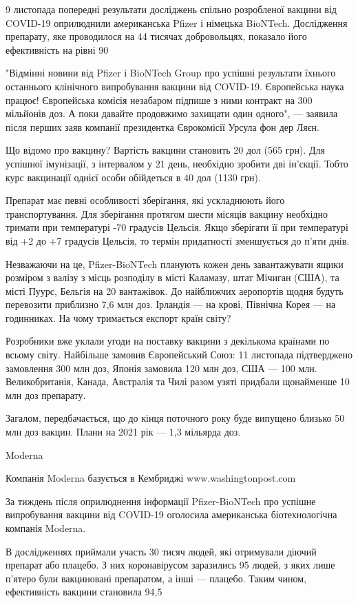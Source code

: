 9 листопада попередні результати досліджень спільно розробленої вакцини від COVID-19 оприлюднили американська Pfizer і німецька BioNTech. Дослідження препарату, яке проводилося на 44 тисячах добровольцях, показало його ефективність на рівні 90%

"Відмінні новини від Pfizer і BioNTech Group про успішні результати їхнього останнього клінічного випробування вакцини від COVID-19. Європейська наука працює! Європейська комісія незабаром підпише з ними контракт на 300 мільйонів доз. А поки давайте продовжимо захищати один одного", --- заявила після перших заяв компанії президентка Єврокомісії Урсула фон дер Ляєн.

    Що відомо про вакцину? Вартість вакцини становить 20 дол (565 грн). Для успішної імунізації, з інтервалом у 21 день, необхідно зробити дві ін’єкції. Тобто курс вакцинації однієї особи обійдеться в 40 дол (1130 грн).

    Препарат має певні особливості зберігання, які ускладнюють його транспортування. Для зберігання протягом шести місяців вакцину необхідно тримати при температурі -70 градусів Цельсія. Якщо зберігати її при температурі від +2 до +7 градусів Цельсія, то термін придатності зменшується до п'яти днів.

Незважаючи на це, Pfizer-BioNTech планують кожен день завантажувати ящики розміром з валізу з місць розподілу в місті Каламазу, штат Мічиган (США), та місті Пуурс, Бельгія на 20 вантажівок. До найближчих аеропортів щодня будуть перевозити приблизно 7,6 млн доз.
Ірландія --- на крові, Північна Корея --- на годинниках. На чому тримається експорт країн світу?

Розробники вже уклали угоди на поставку вакцини з декількома країнами по всьому світу. Найбільше замовив Європейський Союз: 11 листопада підтверджено замовлення 300 млн доз, Японія замовила 120 млн доз, США --- 100 млн. Великобританія, Канада, Австралія та Чилі разом узяті придбали щонайменше 10 млн доз препарату.

    Загалом, передбачається, що до кінця поточного року буде випущено близько 50 млн доз вакцин. Плани на 2021 рік --- 1,3 мільярда доз.

Moderna
 
Компанія Moderna базується в Кембриджі
www.washingtonpost.com

За тиждень після оприлюднення інформації Pfizer-BioNTech про успішне випробування вакцини від COVID-19 оголосила американська біотехнологічна компанія Moderna.

В дослідженнях приймали участь 30 тисяч людей, які отримували діючий препарат або плацебо. З них коронавірусом заразились 95 людей, з яких лише п'ятеро були вакциновані препаратом, а інші --- плацебо. Таким чином, ефективність вакцини становила 94,5%

